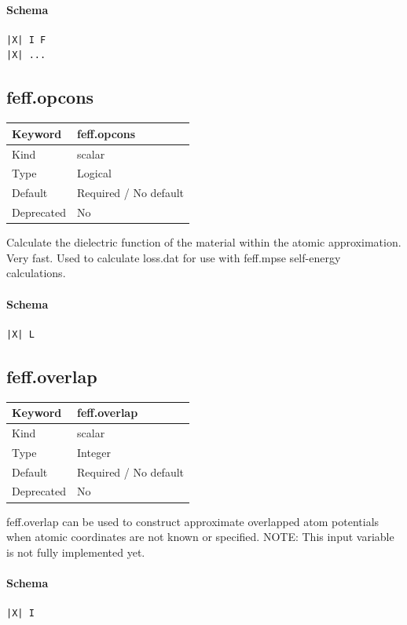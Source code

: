 \documentclass[11pt]{article}
\begin{document}
{{{{\paragraph{Schema}
\begin{Verbatim}
|X| I F
|X| ...
\end{Verbatim}

\subsection{feff.opcons}
\label{kw:feff-opcons}
\begin{longtable}{|p{1.5in}|p{4.5in}|}
\hline
Keyword & feff.opcons \\
\hline
Kind & scalar \\
\hline
Type & Logical \\
\hline
Default & Required / No default \\
\hline
Deprecated & No \\
\hline
\end{longtable}
 Calculate the dielectric function of the material within the
 atomic approximation. Very fast. Used to calculate loss.dat for
 use with feff.mpse self-energy calculations.

\paragraph{Schema}
\begin{Verbatim}
|X| L
\end{Verbatim}

\subsection{feff.overlap}
\label{kw:feff-overlap}
\begin{longtable}{|p{1.5in}|p{4.5in}|}
\hline
Keyword & feff.overlap \\
\hline
Kind & scalar \\
\hline
Type & Integer \\
\hline
Default & Required / No default \\
\hline
Deprecated & No \\
\hline
\end{longtable}
 feff.overlap can be used to construct approximate overlapped atom potentials
 when atomic coordinates are not known or specified.
 NOTE: This input variable is not fully implemented yet.

\paragraph{Schema}
\begin{Verbatim}
|X| I
\end{Verbatim}

}}}}
\end{document}

